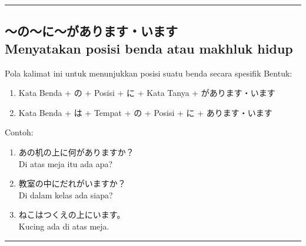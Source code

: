 \vspace{0.2cm}\hrule height 1pt\vspace{0.2cm}


\subsection*{
    ～の～に～があります・います \\
    Menyatakan posisi benda atau makhluk hidup
}
Pola kalimat ini untuk menunjukkan posisi suatu benda secara spesifik
Bentuk:
\begin{enumerate}
    \item Kata Benda + の + Posisi + に + Kata Tanya + があります・います
    \item Kata Benda + は + Tempat + の + Posisi + に + あります・います
\end{enumerate}
Contoh: 
\begin{enumerate}
    \item あの机の上に何がありますか？
    \\ Di atas meja itu ada apa?
    \item 教室の中にだれがいますか？
    \\ Di dalam kelas ada siapa?
    \item ねこはつくえの上にいます。
    \\ Kucing ada di atas meja.
\end{enumerate}

\vspace{0.2cm}\hrule height 1pt\vspace{0.2cm}